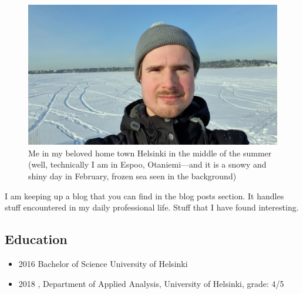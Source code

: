 \documentclass{article}
\begin{document}




        

        \begin{figure}
          \includegraphics[width=\linewidth]{me1.jpg}
          \caption{Me in my beloved home town Helsinki in the middle of the summer (well, technically I am in Espoo, Otaniemi---and it is a snowy and shiny day in February, frozen sea seen in the background)}
        \end{figure}

        
        I am keeping up a blog that you can find in the blog posts section. It handles stuff encountered in my daily professional life. Stuff that I have found interesting. 
        

        \subsection{Education}
        \begin{itemize}
        \item 2016 Bachelor of Science University of Helsinki\\
        \item 2018 , Department of Applied Analysis, University of Helsinki, grade: 4/5
          
        \end{itemize}
\end{document}
